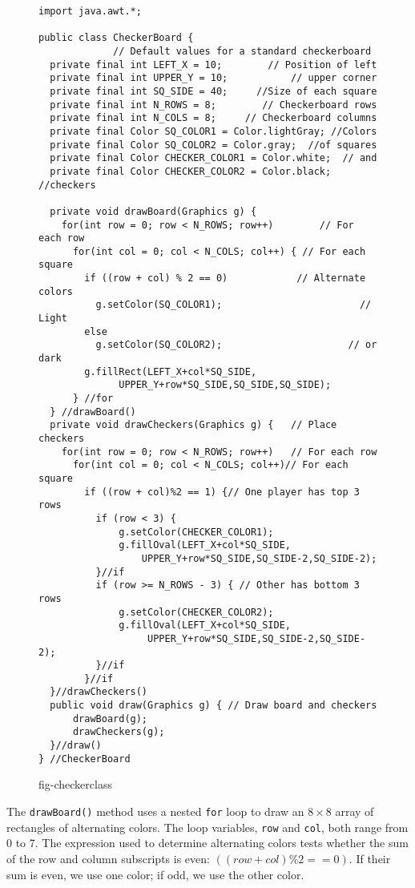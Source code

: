 \begin{figure}[h!]
\jjjprogstart
\begin{jjjlisting}[28pc]
\begin{lstlisting}
import java.awt.*;

public class CheckerBoard {
             // Default values for a standard checkerboard
  private final int LEFT_X = 10;        // Position of left
  private final int UPPER_Y = 10;           // upper corner
  private final int SQ_SIDE = 40;     //Size of each square
  private final int N_ROWS = 8;        // Checkerboard rows
  private final int N_COLS = 8;     // Checkerboard columns
  private final Color SQ_COLOR1 = Color.lightGray; //Colors
  private final Color SQ_COLOR2 = Color.gray;  //of squares
  private final Color CHECKER_COLOR1 = Color.white;  // and
  private final Color CHECKER_COLOR2 = Color.black; //checkers

  private void drawBoard(Graphics g) {
    for(int row = 0; row < N_ROWS; row++)        // For each row
      for(int col = 0; col < N_COLS; col++) { // For each square
        if ((row + col) % 2 == 0)            // Alternate colors
          g.setColor(SQ_COLOR1);                        // Light
        else
          g.setColor(SQ_COLOR2);                      // or dark
        g.fillRect(LEFT_X+col*SQ_SIDE,
              UPPER_Y+row*SQ_SIDE,SQ_SIDE,SQ_SIDE);
      } //for
  } //drawBoard()
  private void drawCheckers(Graphics g) {   // Place checkers
    for(int row = 0; row < N_ROWS; row++)   // For each row
      for(int col = 0; col < N_COLS; col++)// For each square
        if ((row + col)%2 == 1) {// One player has top 3 rows
          if (row < 3) {
              g.setColor(CHECKER_COLOR1);
              g.fillOval(LEFT_X+col*SQ_SIDE,
                  UPPER_Y+row*SQ_SIDE,SQ_SIDE-2,SQ_SIDE-2);
          }//if
          if (row >= N_ROWS - 3) { // Other has bottom 3 rows
              g.setColor(CHECKER_COLOR2);
              g.fillOval(LEFT_X+col*SQ_SIDE,
                   UPPER_Y+row*SQ_SIDE,SQ_SIDE-2,SQ_SIDE-2);
          }//if
        }//if
  }//drawCheckers()
  public void draw(Graphics g) { // Draw board and checkers
      drawBoard(g);
      drawCheckers(g);
  }//draw()
} //CheckerBoard
\end{lstlisting}
\end{jjjlisting}
{fig-checkerclass}
\end{figure}

The {\tt drawBoard()} method uses a nested {\tt for} loop to draw an
$8 \times 8$ array of rectangles of alternating colors. The loop
variables, {\tt row} and {\tt col}, both range from 0 to 7.  The
expression used to determine alternating colors tests whether the sum
of the row and column subscripts is even: $((row + col) \% 2 == 0)$.
If their sum is even, we use one color; if odd, we use the other
color. 


